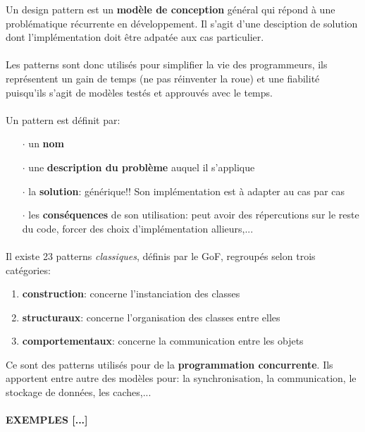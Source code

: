 \item{}
{Un design pattern est un \textbf{modèle de conception} général qui répond à une problématique récurrente en développement. Il s'agit d'une desciption de solution dont l'implémentation doit être adpatée aux cas particulier.
\paragraph{}
Les patterns sont donc utilisés pour simplifier la vie des programmeurs, ils représentent un gain de temps (ne pas réinventer la roue) et une fiabilité puisqu'ils s'agit de modèles testés et approuvés avec le temps.

\paragraph{}
Un pattern est définit par:
\begin{itemize}
\item[$\cdot$]un \textbf{nom}
\item[$\cdot$]une \textbf{description du problème} auquel il s'applique
\item[$\cdot$]la \textbf{solution}: générique!! Son implémentation est à adapter au cas par cas
\item[$\cdot$]les \textbf{conséquences} de son utilisation: peut avoir des répercutions sur le reste du code, forcer des choix d'implémentation allieurs,...
\end{itemize}

\paragraph{}
Il existe 23 patterns \textit{classiques}, définis par le GoF, regroupés selon trois catégories:
\begin{enumerate}
\item \textbf{construction}: concerne l'instanciation des classes
\item \textbf{structuraux}: concerne l'organisation des classes entre elles
\item \textbf{comportementaux}: concerne la communication entre les objets
\end{enumerate}
}

\item{}
{Ce sont des patterns utilisés pour de la \textbf{programmation concurrente}.
Ils apportent entre autre des modèles pour: la synchronisation, la communication, le stockage de données, les caches,...\paragraph{EXEMPLES [...]}
}

